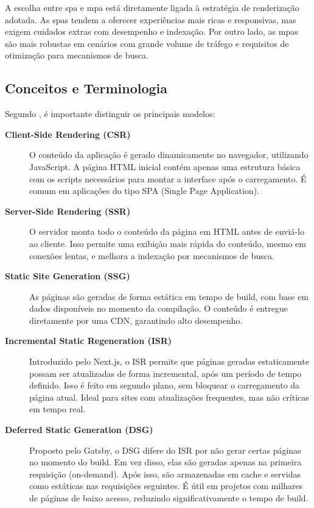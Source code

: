 A escolha entre \acrshort{spa} e \acrshort{mpa} está diretamente ligada à estratégia de renderização adotada. As \acrshort{spa}s tendem a oferecer experiências mais ricas e responsivas, mas exigem cuidados extras com desempenho e indexação. Por outro lado, as \acrshort{mpa}s são mais robustas em cenários com grande volume de tráfego e requisitos de otimização para mecanismos de busca.



\subsection*{Conceitos e Terminologia}

Segundo , é importante distinguir os principais modelos:


\begin{description}
  \item[\textbf{Client-Side Rendering (CSR)}] 
  O conteúdo da aplicação é gerado dinamicamente no navegador, utilizando JavaScript. A página HTML inicial contém apenas uma estrutura básica com os scripts necessários para montar a interface após o carregamento. É comum em aplicações do tipo SPA (Single Page Application).
  
  \item[\textbf{Server-Side Rendering (SSR)}]
  O servidor monta todo o conteúdo da página em HTML antes de enviá-lo ao cliente. Isso permite uma exibição mais rápida do conteúdo, mesmo em conexões lentas, e melhora a indexação por mecanismos de busca.

  \item[\textbf{Static Site Generation (SSG)}]
  As páginas são geradas de forma estática em tempo de build, com base em dados disponíveis no momento da compilação. O conteúdo é entregue diretamente por uma CDN, garantindo alto desempenho.

  \item[\textbf{Incremental Static Regeneration (ISR)}]
  Introduzido pelo Next.js, o ISR permite que páginas geradas estaticamente possam ser atualizadas de forma incremental, após um período de tempo definido. Isso é feito em segundo plano, sem bloquear o carregamento da página atual. Ideal para sites com atualizações frequentes, mas não críticas em tempo real.

  \item[\textbf{Deferred Static Generation (DSG)}]
  Proposto pelo Gatsby, o DSG difere do ISR por não gerar certas páginas no momento do build. Em vez disso, elas são geradas apenas na primeira requisição (on-demand). Após isso, são armazenadas em cache e servidas como estáticas nas requisições seguintes. É útil em projetos com milhares de páginas de baixo acesso, reduzindo significativamente o tempo de build.
\end{description}

